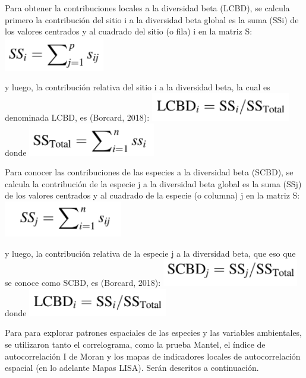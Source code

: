 \documentclass[11pt,]{article}
\begin{document}
Para obtener la contribuciones locales a la diversidad beta (LCBD), se
calcula primero la contribución del sitio i a la diversidad beta global
es la suma (SSi) de los valores centrados y al cuadrado del sitio (o
fila) i en la matriz S: \includegraphics{beta_local.PNG}

y luego, la contribución relativa del sitio i a la diversidad beta, la
cual es denominada LCBD, es (Borcard, 2018):
\includegraphics{beta_especies.png} donde
\includegraphics{beta_local2.PNG}

Para conocer las contribuciones de las especies a la diversidad beta
(SCBD), se calcula la contribución de la especie j a la diversidad beta
global es la suma (SSj) de los valores centrados y al cuadrado de la
especie (o columna) j en la matriz S:
\includegraphics{beta_especies1.PNG}

y luego, la contribución relativa de la especie j a la diversidad beta,
que eso que se conoce como SCBD, es (Borcard, 2018):
\includegraphics{beta_especies2.PNG} donde
\includegraphics{beta_especies.png}

Para para explorar patrones espaciales de las especies y las variables
ambientales, se utilizaron tanto el correlograma, como la prueba Mantel,
el índice de autocorrelación I de Moran y los mapas de indicadores
locales de autocorrelación espacial (en lo adelante Mapas LISA). Serán
descritos a continuación.
\end{document}
